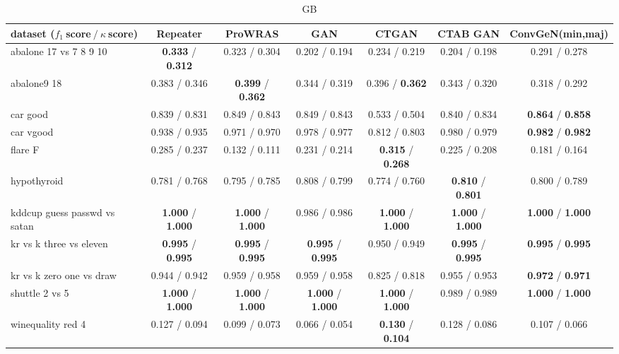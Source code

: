 \begin{table*}[ht]\scriptsize\caption{GB}\label{tab:results:GB:A}\centering\tabularnewline
\begin{tabular}{l|@{\hskip3pt}c@{\hskip3pt}|@{\hskip3pt}c@{\hskip3pt}|@{\hskip3pt}c@{\hskip3pt}|@{\hskip3pt}c@{\hskip3pt}|@{\hskip3pt}c@{\hskip3pt}|@{\hskip3pt}c@{\hskip3pt}}\hline
\textbf{dataset ($f_1~$score$~/~\kappa~$score)} & \textbf{Repeater} & \textbf{ProWRAS} & \textbf{GAN} & \textbf{CTGAN} & \textbf{CTAB GAN} & \textbf{ConvGeN(min,maj)}
\tabularnewline
\hline
abalone 17 vs 7 8 9 10 &  \textbf{0.333}  /  \textbf{0.312}  &  0.323  /  0.304  &  0.202  /  0.194  &  0.234  /  0.219  &  0.204  /  0.198  &  0.291  /  0.278 
\tabularnewline
abalone9 18 &  0.383  /  0.346  &  \textbf{0.399}  /  \textbf{0.362}  &  0.344  /  0.319  &  0.396  /  \textbf{0.362}  &  0.343  /  0.320  &  0.318  /  0.292 
\tabularnewline
car good &  0.839  /  0.831  &  0.849  /  0.843  &  0.849  /  0.843  &  0.533  /  0.504  &  0.840  /  0.834  &  \textbf{0.864}  /  \textbf{0.858} 
\tabularnewline
car vgood &  0.938  /  0.935  &  0.971  /  0.970  &  0.978  /  0.977  &  0.812  /  0.803  &  0.980  /  0.979  &  \textbf{0.982}  /  \textbf{0.982} 
\tabularnewline
flare F &  0.285  /  0.237  &  0.132  /  0.111  &  0.231  /  0.214  &  \textbf{0.315}  /  \textbf{0.268}  &  0.225  /  0.208  &  0.181  /  0.164 
\tabularnewline
hypothyroid &  0.781  /  0.768  &  0.795  /  0.785  &  0.808  /  0.799  &  0.774  /  0.760  &  \textbf{0.810}  /  \textbf{0.801}  &  0.800  /  0.789 
\tabularnewline
kddcup guess passwd vs satan &  \textbf{1.000}  /  \textbf{1.000}  &  \textbf{1.000}  /  \textbf{1.000}  &  0.986  /  0.986  &  \textbf{1.000}  /  \textbf{1.000}  &  \textbf{1.000}  /  \textbf{1.000}  &  \textbf{1.000}  /  \textbf{1.000} 
\tabularnewline
kr vs k three vs eleven &  \textbf{0.995}  /  \textbf{0.995}  &  \textbf{0.995}  /  \textbf{0.995}  &  \textbf{0.995}  /  \textbf{0.995}  &  0.950  /  0.949  &  \textbf{0.995}  /  \textbf{0.995}  &  \textbf{0.995}  /  \textbf{0.995} 
\tabularnewline
kr vs k zero one vs draw &  0.944  /  0.942  &  0.959  /  0.958  &  0.959  /  0.958  &  0.825  /  0.818  &  0.955  /  0.953  &  \textbf{0.972}  /  \textbf{0.971} 
\tabularnewline
shuttle 2 vs 5 &  \textbf{1.000}  /  \textbf{1.000}  &  \textbf{1.000}  /  \textbf{1.000}  &  \textbf{1.000}  /  \textbf{1.000}  &  \textbf{1.000}  /  \textbf{1.000}  &  0.989  /  0.989  &  \textbf{1.000}  /  \textbf{1.000} 
\tabularnewline
winequality red 4 &  0.127  /  0.094  &  0.099  /  0.073  &  0.066  /  0.054  &  \textbf{0.130}  /  \textbf{0.104}  &  0.128  /  0.086  &  0.107  /  0.066 

\end{tabular}
\end{table*}

